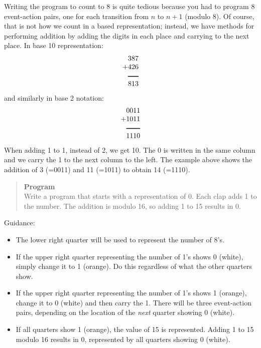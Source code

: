 Writing the program to count to 8 is quite tedious because you had to
program 8 event-action pairs, one for each transition from $n$ to $n+1$
(modulo 8). Of course, that is not how we count in a based
representation;
instead, we have methods for performing addition by adding the digits
in each place and carrying to the next place. In base 10
representation:
\begin{displaymath}
\begin{array}{r}
387\\
+426\\
\rule[1pt]{1.5em}{1pt}\\
813\\
\end{array}
\end{displaymath}
and similarly in base 2 notation:
\begin{displaymath}
\begin{array}{r}
0011\\
+1011\\
\rule[1pt]{2em}{1pt}\\
1110\\
\end{array}
\end{displaymath}
When adding 1 to 1, instead of 2, we get 10.
The 0 is written in the same column and we carry the 1 to the next
column to the left.
The example above shows the addition of 3 (=0011) and 11 (=1011)
to obtain 14 (=1110).

\begin{quote}
\textbf{Program}\\
Write a program that starts with a representation of 0.
Each clap adds 1 to the number.
The addition is modulo 16, so adding 1 to 15 results in 0.
\end{quote}

Guidance:

\begin{itemize}
\item The lower right quarter will be used to represent the number of 8's.
\item If the upper right quarter representing the number
of 1's shows 0 (white),
simply change it to 1 (orange). Do this regardless of what the other
quarters show.
\item If the upper right quarter representing the number of 1's
shows 1 (orange),
change it to 0 (white) and then carry the 1.
There will be three event-action pairs,
depending on the location of the \emph{next} quarter showing 0
(white).
\item If all quarters show 1 (orange), the value of 15 is represented.
Adding 1 to 15 modulo 16 results in 0, represented by all quarters
showing 0 (white).
\end{itemize}


